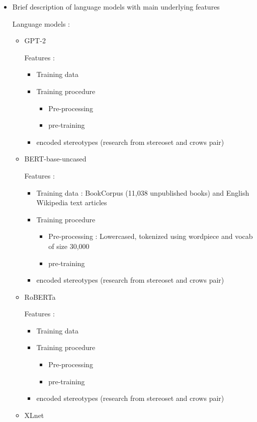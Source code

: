 \begin{itemize}
    \item Brief description of language models with main underlying features
    
    Language models :
    \begin{itemize}
        \item GPT-2 \cite{radford2019language}
        
            Features :
    \begin{itemize}
        \item Training data 
        \item Training procedure
        \begin{itemize}
            \item Pre-processing
            \item pre-training
        \end{itemize}
        \item encoded stereotypes (research from stereoset and crows pair)
    \end{itemize}
        \item BERT-base-uncased
        
            Features \cite{devlin2018bert}:
            \begin{itemize}
                \item Training data : BookCorpus (11,038 unpublished books) and English Wikipedia text articles  
                \item Training procedure
                \begin{itemize}
                    \item Pre-processing : Lowercased, tokenized using wordpiece and vocab of size 30,000
                \item pre-training 
                \end{itemize}
                \item encoded stereotypes (research from stereoset and crows pair)
    \end{itemize}
        \item RoBERTa \cite{liu2019roberta}
        
            Features :
            \begin{itemize}
                \item Training data 
                \item Training procedure
                \begin{itemize}
                    \item Pre-processing
                    \item pre-training
                \end{itemize}
                \item encoded stereotypes (research from stereoset and crows pair)
            \end{itemize}
        \item XLnet \cite{yang2019xlnet}
        

\end{itemize}
\end{itemize}
